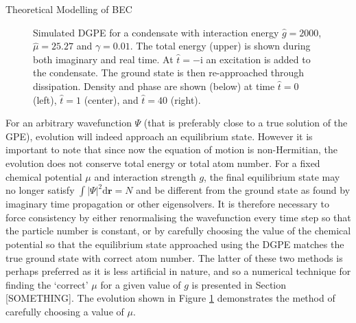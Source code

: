 \begin{chapter}{\label{cha:theoretical_model}Theoretical Modelling of BEC}
\begin{figure}[!ht]
\hspace{-0.05\linewidth}
	\caption{Simulated DGPE for a condensate with interaction energy $\hat{g}=2000$, $\hat{\mu}=25.27$ and $\gamma=0.01$. The total energy (upper) is shown during both imaginary and real time. At $\hat{t} = -\mathrm{i}$ an excitation is added to the condensate. The ground state is then re-approached through dissipation. Density and phase are shown (below) at time $\hat{t}=0$ (left), $\hat{t}=1$ (center), and $\hat{t}=40$ (right).}\label{fig_excitationdecay}
\end{figure}

	For an arbitrary wavefunction $\Psi$ (that is preferably close to a true solution of the GPE), evolution will indeed approach an equilibrium state. However it is important to note that since now the equation of motion is non-Hermitian, the evolution does not conserve total energy or total atom number. For a fixed chemical potential $\mu$ and interaction strength $g$, the final equilibrium state may no longer satisfy $\int |\Psi|^2 \mathrm{d}\mathbf{r} = N$ and be different from the ground state as found by imaginary time propagation or other eigensolvers. It is therefore necessary to force consistency by either renormalising the wavefunction every time step so that the particle number is constant, or by carefully choosing the value of the chemical potential so that the equilibrium state approached using the DGPE matches the true ground state with correct atom number. The latter of these two methods is perhaps preferred as it is less artificial in nature, and so a numerical technique for finding the `correct' $\mu$ for a given value of $g$ is presented in Section [SOMETHING]. The evolution shown in Figure \ref{fig_excitationdecay} demonstrates the method of carefully choosing a value of $\mu$.


\end{chapter}
